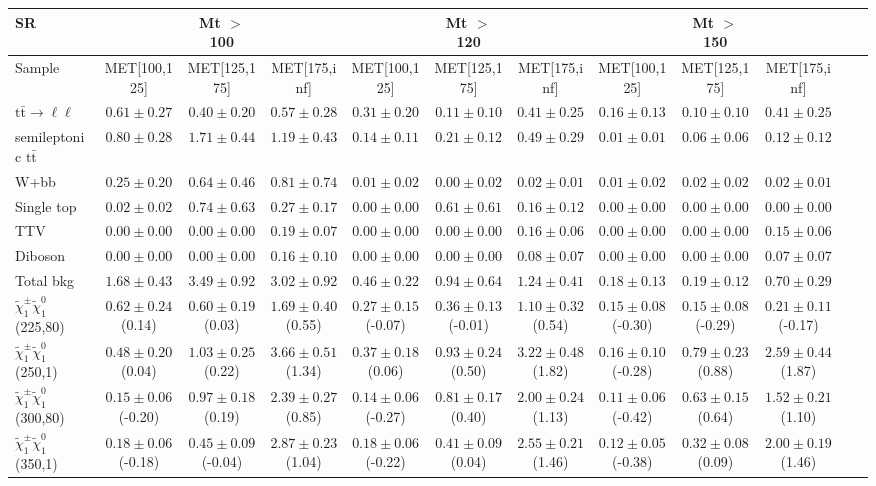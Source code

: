 \begin{table}
\begin{center}
\small
\begin{tabular}{lccccccccccc}
\hline
SR & & Mt $>$ 100 & & & Mt $>$ 120 & & &Mt $>$ 150 & & &\\
\hline
Sample&MET[100,125]&MET[125,175]&MET[175,inf]&MET[100,125]&MET[125,175]&MET[175,inf]&MET[100,125]&MET[125,175]&MET[175,inf]&\\
\hline
$\mathrm{t}\bar{\mathrm{t}}\rightarrow \ell\ell$&$0.61\pm0.27$&$0.40\pm0.20$&$0.57\pm0.28$&$0.31\pm0.20$&$0.11\pm0.10$&$0.41\pm0.25$&$0.16\pm0.13$&$0.10\pm0.10$&$0.41\pm0.25$\\
semileptonic $\mathrm{t}\bar{\mathrm{t}}$&$0.80\pm0.28$&$1.71\pm0.44$&$1.19\pm0.43$&$0.14\pm0.11$&$0.21\pm0.12$&$0.49\pm0.29$&$0.01\pm0.01$&$0.06\pm0.06$&$0.12\pm0.12$\\
W+bb&$0.25\pm0.20$&$0.64\pm0.46$&$0.81\pm0.74$&$0.01\pm0.02$&$0.00\pm0.02$&$0.02\pm0.01$&$0.01\pm0.02$&$0.02\pm0.02$&$0.02\pm0.01$\\
Single top&$0.02\pm0.02$&$0.74\pm0.63$&$0.27\pm0.17$&$0.00\pm0.00$&$0.61\pm0.61$&$0.16\pm0.12$&$0.00\pm0.00$&$0.00\pm0.00$&$0.00\pm0.00$\\
TTV&$0.00\pm0.00$&$0.00\pm0.00$&$0.19\pm0.07$&$0.00\pm0.00$&$0.00\pm0.00$&$0.16\pm0.06$&$0.00\pm0.00$&$0.00\pm0.00$&$0.15\pm0.06$\\
Diboson&$0.00\pm0.00$&$0.00\pm0.00$&$0.16\pm0.10$&$0.00\pm0.00$&$0.00\pm0.00$&$0.08\pm0.07$&$0.00\pm0.00$&$0.00\pm0.00$&$0.07\pm0.07$\\
\hline
Total bkg&$1.68\pm0.43$&$3.49\pm0.92$&$3.02\pm0.92$&$0.46\pm0.22$&$0.94\pm0.64$&$1.24\pm0.41$&$0.18\pm0.13$&$0.19\pm0.12$&$0.70\pm0.29$\\
$\tilde{\chi}_{1}^{\pm}\tilde{\chi}_{1}^{0}$ (225,80)&$0.62\pm0.24$(0.14)&$0.60\pm0.19$(0.03)&$1.69\pm0.40$(0.55)&$0.27\pm0.15$(-0.07)&$0.36\pm0.13$(-0.01)&$1.10\pm0.32$(0.54)&$0.15\pm0.08$(-0.30)&$0.15\pm0.08$(-0.29)&$0.21\pm0.11$(-0.17)\\
$\tilde{\chi}_{1}^{\pm}\tilde{\chi}_{1}^{0}$ (250,1)&$0.48\pm0.20$(0.04)&$1.03\pm0.25$(0.22)&$3.66\pm0.51$(1.34)&$0.37\pm0.18$(0.06)&$0.93\pm0.24$(0.50)&$3.22\pm0.48$(1.82)&$0.16\pm0.10$(-0.28)&$0.79\pm0.23$(0.88)&$2.59\pm0.44$(1.87)\\
$\tilde{\chi}_{1}^{\pm}\tilde{\chi}_{1}^{0}$ (300,80)&$0.15\pm0.06$(-0.20)&$0.97\pm0.18$(0.19)&$2.39\pm0.27$(0.85)&$0.14\pm0.06$(-0.27)&$0.81\pm0.17$(0.40)&$2.00\pm0.24$(1.13)&$0.11\pm0.06$(-0.42)&$0.63\pm0.15$(0.64)&$1.52\pm0.21$(1.10)\\
$\tilde{\chi}_{1}^{\pm}\tilde{\chi}_{1}^{0}$ (350,1)&$0.18\pm0.06$(-0.18)&$0.45\pm0.09$(-0.04)&$2.87\pm0.23$(1.04)&$0.18\pm0.06$(-0.22)&$0.41\pm0.09$(0.04)&$2.55\pm0.21$(1.46)&$0.12\pm0.05$(-0.38)&$0.32\pm0.08$(0.09)&$2.00\pm0.19$(1.46)\\
\hline
\hline\hline
\end{tabular}
\end{center}
\end{table}
